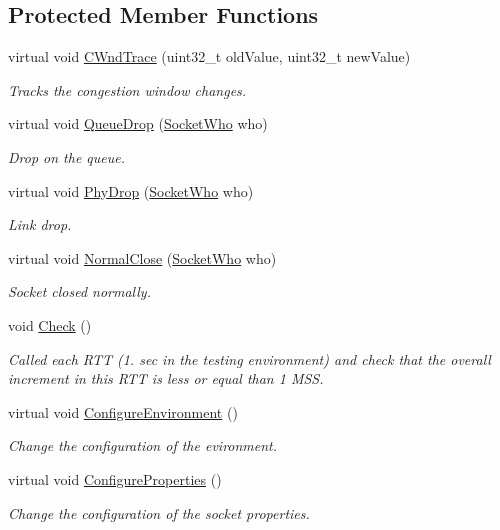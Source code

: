 \subsection*{Protected Member Functions}
\begin{DoxyCompactItemize}
\item 
virtual void \hyperlink{classTcpNewRenoCongAvoidNormalTest_a136b3f397552cacae5f77c8462d7aab8}{C\+Wnd\+Trace} (uint32\+\_\+t old\+Value, uint32\+\_\+t new\+Value)
\begin{DoxyCompactList}\small\item\em Tracks the congestion window changes. \end{DoxyCompactList}\item 
virtual void \hyperlink{classTcpNewRenoCongAvoidNormalTest_abe06925f1c3a99480216ba9226d4e122}{Queue\+Drop} (\hyperlink{classns3_1_1TcpGeneralTest_a29338e6b7137cad650c2ff835713f6ee}{Socket\+Who} who)
\begin{DoxyCompactList}\small\item\em Drop on the queue. \end{DoxyCompactList}\item 
virtual void \hyperlink{classTcpNewRenoCongAvoidNormalTest_a3d1ddc1c8551aedd88edc8c52c63695f}{Phy\+Drop} (\hyperlink{classns3_1_1TcpGeneralTest_a29338e6b7137cad650c2ff835713f6ee}{Socket\+Who} who)
\begin{DoxyCompactList}\small\item\em Link drop. \end{DoxyCompactList}\item 
virtual void \hyperlink{classTcpNewRenoCongAvoidNormalTest_a33afb3bc951667bb6d37248e7d57b36b}{Normal\+Close} (\hyperlink{classns3_1_1TcpGeneralTest_a29338e6b7137cad650c2ff835713f6ee}{Socket\+Who} who)
\begin{DoxyCompactList}\small\item\em Socket closed normally. \end{DoxyCompactList}\item 
void \hyperlink{classTcpNewRenoCongAvoidNormalTest_a0190333cb3f5f5c85918907d0f680717}{Check} ()
\begin{DoxyCompactList}\small\item\em Called each R\+TT (1. sec in the testing environment) and check that the overall increment in this R\+TT is less or equal than 1 M\+SS. \end{DoxyCompactList}\item 
virtual void \hyperlink{classTcpNewRenoCongAvoidNormalTest_aec6c98b12f00b2e8cdb477651865e207}{Configure\+Environment} ()
\begin{DoxyCompactList}\small\item\em Change the configuration of the evironment. \end{DoxyCompactList}\item 
virtual void \hyperlink{classTcpNewRenoCongAvoidNormalTest_a87b014a34cc1f1786736719d1616421b}{Configure\+Properties} ()
\begin{DoxyCompactList}\small\item\em Change the configuration of the socket properties. \end{DoxyCompactList}\end{DoxyCompactItemize}
